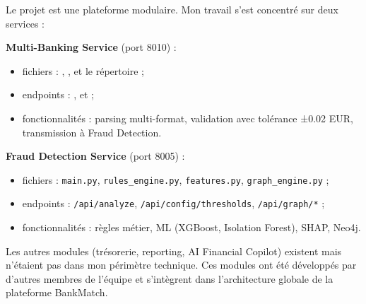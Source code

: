 \documentclass[12pt,a4paper]{extreport}
\begin{document}
Le projet est une plateforme modulaire. Mon travail s'est concentré sur deux services :

\textbf{Multi-Banking Service} (port 8010) :
\begin{itemize}
    \item fichiers : , ,  et le répertoire  ;
    \item endpoints : ,  et  ;
    \item fonctionnalités : parsing multi-format, validation avec tolérance ±0.02 EUR, transmission à Fraud Detection.
\end{itemize}

\textbf{Fraud Detection Service} (port 8005) :
\begin{itemize}
    \item fichiers : \texttt{main.py}, \texttt{rules\_engine.py}, \texttt{features.py}, \texttt{graph\_engine.py} ;
    \item endpoints : \texttt{/api/analyze}, \texttt{/api/config/thresholds}, \texttt{/api/graph/*} ;
    \item fonctionnalités : règles métier, ML (XGBoost, Isolation Forest), SHAP, Neo4j.
\end{itemize}

Les autres modules (trésorerie, reporting, AI Financial Copilot) existent mais n'étaient pas dans mon périmètre technique. Ces modules ont été développés par d'autres membres de l'équipe et s'intègrent dans l'architecture globale de la plateforme BankMatch.
\end{document}

